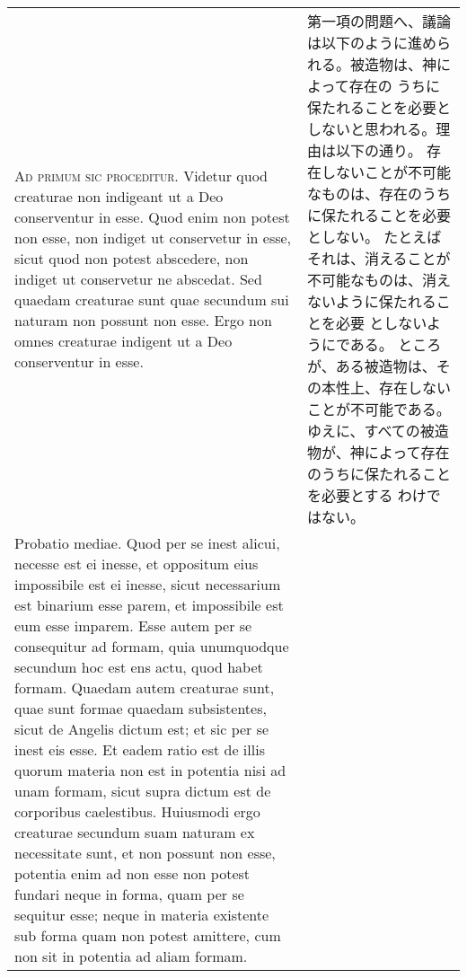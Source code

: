 \documentclass[10pt]{jsarticle} %
\begin{document}
\begin{longtable}{p{21em}p{21em}}


{\huge A}{\scshape d primum sic proceditur}. Videtur quod
creaturae non indigeant ut a Deo conserventur in esse. Quod enim non
potest non esse, non indiget ut conservetur in esse, sicut quod non
potest abscedere, non indiget ut conservetur ne abscedat. Sed quaedam
creaturae sunt quae secundum sui naturam non possunt non esse. Ergo non
omnes creaturae indigent ut a Deo conserventur in esse. 


&

第一項の問題へ、議論は以下のように進められる。被造物は、神によって存在の
 うちに保たれることを必要としないと思われる。理由は以下の通り。
存在しないことが不可能なものは、存在のうちに保たれることを必要としない。
 たとえばそれは、消えることが不可能なものは、消えないように保たれることを必要
 としないようにである。
ところが、ある被造物は、その本性上、存在しないことが不可能である。
ゆえに、すべての被造物が、神によって存在のうちに保たれることを必要とする
 わけではない。


\\



Probatio
mediae. Quod per se inest alicui, necesse est ei inesse, et oppositum
eius impossibile est ei inesse, sicut necessarium est binarium esse
parem, et impossibile est eum esse imparem. Esse autem per se
consequitur ad formam, quia unumquodque secundum hoc est ens actu, quod
habet formam. Quaedam autem creaturae sunt, quae sunt formae quaedam
subsistentes, sicut de Angelis dictum est; et sic per se inest eis
esse. Et eadem ratio est de illis quorum materia non est in potentia
nisi ad unam formam, sicut supra dictum est de corporibus
caelestibus. Huiusmodi ergo creaturae secundum suam naturam ex
necessitate sunt, et non possunt non esse, potentia enim ad non esse non
potest fundari neque in forma, quam per se sequitur esse; neque in
materia existente sub forma quam non potest amittere, cum non sit in
potentia ad aliam formam.


&


\end{longtable}
\end{document}
